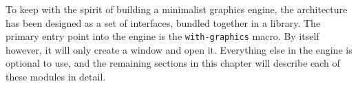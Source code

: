 
\label{SEC:ARCH}

To keep with the spirit of building a minimalist graphics engine,
the architecture has been designed as a set of interfaces,
bundled together in a library.
The primary entry point into the engine is the \texttt{with-graphics} macro.
By itself however,
it will only create a window and open it.
Everything else in the engine is optional to use,
and the remaining sections in this chapter will describe each of these modules in detail.
